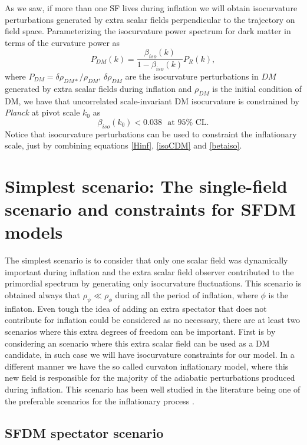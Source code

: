 \documentclass[amssymb,twocolumn,prd,nofootinbib,showpacs]{revtex4-1}
\begin{document}
As we saw, if more than one SF lives during inflation we will obtain isocurvature perturbations generated by extra scalar fields perpendicular to the trajectory on field space. Parameterizing the isocurvature power spectrum for dark matter in terms of the curvature power as
\begin{equation}\label{isoCDM}
P_{DM}(k) = \frac{\beta_{iso}(k)}{1-\beta_{iso}(k)}P_R(k),
\end{equation}
where $P_{DM}=\delta \rho_{DM*}/\rho_{DM}$, $\delta\rho_{DM}$ are the isocurvature perturbations in $DM$ generated by extra scalar fields during inflation and $\rho_{DM}$ is the initial condition of DM, we have that uncorrelated scale-invariant DM isocurvature is constrained by \textit{Planck} \cite{const1,const2} at pivot scale $k_0$ as
\begin{equation}\label{betaiso}
\beta_{iso}(k_0)<0.038 \ \ \ \text{at $95\%$ CL}.
\end{equation}
Notice that isocurvature perturbations can be used to constraint the inflationary scale, just by combining equations \eqref{Hinf}, \eqref{isoCDM} and \eqref{betaiso}.
%
%
%
%
%
%
\section{Simplest scenario: The single-field scenario and constraints for SFDM models}\label{simplest}

The simplest scenario is to consider that only one scalar field was dynamically important during inflation and the extra scalar field observer contributed to the primordial spectrum by generating only isocurvature fluctuations. This scenario is obtained always that $\rho_{\psi}\ll \rho_{\phi}$ during all the period of inflation, where $\phi$ is the inflaton. Even tough the idea of adding an extra spectator that does not contribute for inflation could be considered as no necessary, there are at least two scenarios where this extra degrees of freedom can be important. First is by considering an scenario where this extra scalar field can be used as a DM candidate, in such case we will have isocurvature constraints for our model. In a different manner we have the so called curvaton inflationary model, where this new field is responsible for the majority of the adiabatic perturbations produced during inflation. This scenario has been well studied in the literature being one of the preferable scenarios for the inflationary process \cite{curvaton15,curvaton16}. 

\subsection{SFDM spectator scenario}
\end{document}
